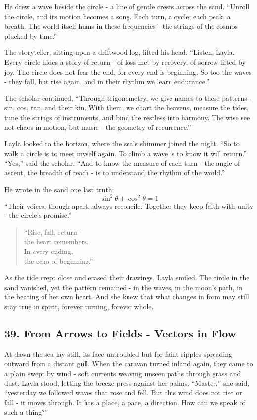 \documentclass[
  letterpaper,
  DIV=11,
  numbers=noendperiod]{scrreprt}
\begin{document}
He drew a wave beside the circle - a line of gentle crests across the
sand. ``Unroll the circle, and its motion becomes a song. Each turn, a
cycle; each peak, a breath. The world itself hums in these frequencies -
the strings of the cosmos plucked by time.''

The storyteller, sitting upon a driftwood log, lifted his head.
``Listen, Layla. Every circle hides a story of return - of loss met by
recovery, of sorrow lifted by joy. The circle does not fear the end, for
every end is beginning. So too the waves - they fall, but rise again,
and in their rhythm we learn endurance.''

The scholar continued, ``Through trigonometry, we give names to these
patterns - sin, cos, tan, and their kin. With them, we chart the
heavens, measure the tides, tune the strings of instruments, and bind
the restless into harmony. The wise see not chaos in motion, but music -
the geometry of recurrence.''

Layla looked to the horizon, where the sea's shimmer joined the night.
``So to walk a circle is to meet myself again. To climb a wave is to
know it will return.'' ``Yes,'' said the scholar. ``And to know the
measure of each turn - the angle of ascent, the breadth of reach - is to
understand the rhythm of the world.''

He wrote in the sand one last truth: \[
\sin^2 θ + \cos^2 θ = 1
\] ``Their voices, though apart, always reconcile. Together they keep
faith with unity - the circle's promise.''

\begin{quote}
``Rise, fall, return -\\
the heart remembers.\\
In every ending,\\
the echo of beginning.''
\end{quote}

As the tide crept close and erased their drawings, Layla smiled. The
circle in the sand vanished, yet the pattern remained - in the waves, in
the moon's path, in the beating of her own heart. And she knew that what
changes in form may still stay true in spirit, forever turning, forever
whole.

\subsection{39. From Arrows to Fields - Vectors in
Flow}\label{from-arrows-to-fields---vectors-in-flow}

At dawn the sea lay still, its face untroubled but for faint ripples
spreading outward from a distant gull. When the caravan turned inland
again, they came to a plain swept by wind - soft currents weaving unseen
paths through grass and dust. Layla stood, letting the breeze press
against her palms. ``Master,'' she said, ``yesterday we followed waves
that rose and fell. But this wind does not rise or fall - it moves
through. It has a place, a pace, a direction. How can we speak of such a
thing?''
\end{document}
